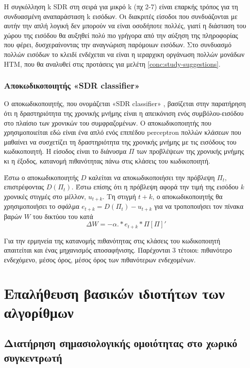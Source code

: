 	Η συγκόλληση k SDR στη σειρά για μικρό k (πχ 2-7) είναι επαρκής τρόπος για τη συνδυασμένη αναπαράσταση k εισόδων.
	Οι διακριτές είσοδοι που συνδυάζονται με αυτήν την απλή λογική δεν μπορούν να είναι οσοδήποτε πολλές,
	γιατί η διάσταση του χώρου της εισόδου θα αυξηθεί πολύ πιο γρήγορα από την αύξηση της πληροφορίας που φέρει,
	δυσχεραίνοντας την αναγνώριση παρόμοιων εισόδων.
	Στο συνδυασμό πολλών εισόδων το κλειδί ενδέχεται να είναι η ιεραρχικη οργάνωση πολλών μονάδων HTM,
	που θα αναλυθεί στις προτάσεις για μελέτη \ref{conc:study-suggestions}.

	\subsubsection{Αποκωδικοποιητής «SDR classifier»}

	Ο αποκωδικοποιητής, που ονομάζεται «SDR classifier» \parencite{cuiContinuousOnlineSequence2016},
	βασίζεται στην παρατήρηση ότι η δραστηριότητα της χρονικής μνήμης είναι η απεικόνιση ενός συμβόλου-εισόδου στο πλαίσιο των χρονικών του συμφραζομένων.
	Ο αποκωδικοποιητής που χρησιμοποιείται εδώ είναι ένα απλό ενός επιπέδου perceptron πολλών κλάσεων που μαθαίνει να συσχετίζει
	τη δραστηριότητα της χρονικής μνήμης με τις εισόδους του κωδικοποιητή.
	Η είσοδος είναι το διάνυσμα $Π$ των προβλέψεων της χρονικής μνήμης κι η έξοδος, κατανομή πιθανότητας πάνω στις κλάσεις του κωδικοποιητή.

	Έστω ο αποκωδικοποιητής $D$ καλείται να αποκωδικοποιήσει την πρόβλεψη $Π_t$, επιστρέφοντας
	$D(Π_t)$.
	Έστω επίσης ότι η πρόβλεψη αφορά την τιμή της εισόδου $k$ χρονικές στιγμές στο μέλλον,
	$u_{t+k}$.
	Τη στιγμή $t+k$, ο αποκωδικοποιητής θα χρησιμοποιήσει το σφάλμα $e_{t+k} = D(Π_t) - u_{t+k}$
	για να τροποποιήσει τον πίνακα βαρών $W$ του δικτύου του κατά
	$$ ΔW= -α .* e_{t+k}*Π[Π]' $$

	Για την ερμηνεία της κατανομής πιθανότητας στις κλάσεις του κωδικοποιητή απαιτείται και ένας μηχανισμός αποσαφήνισης.
	Παρέχονται 3 τέτοιοι: πιθανότερο ενδεχόμενο, μέσος όρος, μέσος όρος των πιθανότερων ενδεχομένων.


\section{Επαλήθευση βασικών ιδιοτήτων των αλγορίθμων}

\subsection{Διατήρηση σημασιολογικής ομοιότητας στο χωρικό συγκεντρωτή}

